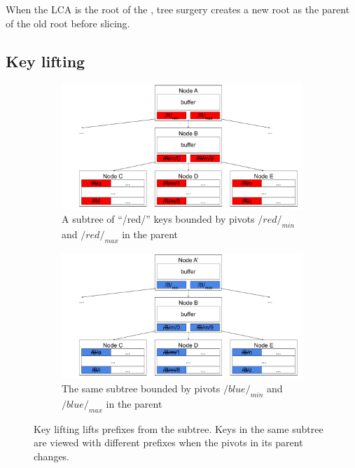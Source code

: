 When the LCA is the root of the \bet, tree surgery creates a new root as the
parent of the old root before slicing.

\subsection{Key lifting}

\begin{figure}
    \begin{subfigure}{\textwidth}
        \centering
        \includegraphics[width=.9\linewidth]{fig/lift-1}
        \caption{\label{subfig:lift-1} A subtree of ``/red/'' keys bounded by
            pivots $/red/_{min}$ and $/red/_{max}$ in the parent}
    \end{subfigure}
    \begin{subfigure}{\textwidth}
        \centering
        \includegraphics[width=.9\linewidth]{fig/lift-2}
        \caption{\label{subfig:lift-2} The same subtree bounded by pivots
            $/blue/_{min}$ and $/blue/_{max}$ in the parent}
    \end{subfigure}
    \caption[Key lifting example]{\label{fig:lift}
        Key lifting lifts prefixes from the subtree. Keys in the same subtree
        are viewed with different prefixes when the pivots in its parent
        changes.}
\end{figure}


